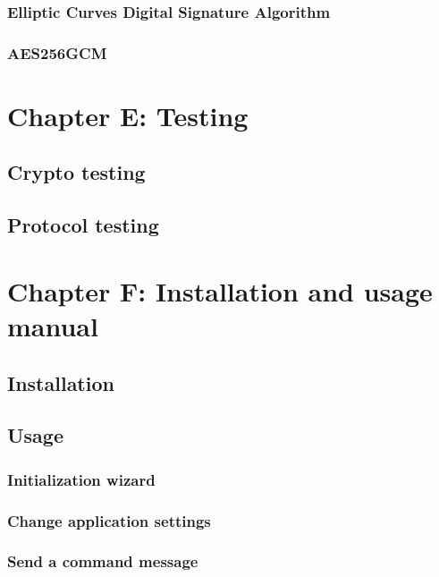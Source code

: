 \documentclass[a4paper,12pt]{article}
\begin{document}
		\subsection{Elliptic Curves Digital Signature Algorithm}
		\subsection{AES256GCM}
\clearpage

\noindent
\Huge{\chapter{Chapter E: Testing}}
	\section{Crypto testing}
	\section{Protocol testing}
\clearpage

\noindent
\Huge{\chapter{Chapter F: Installation and usage manual}}
	\section{Installation}
	\section{Usage}
		\subsection{Initialization wizard}
		\subsection{Change application settings}
		\subsection{Send a command message}
\clearpage
\end{document}
